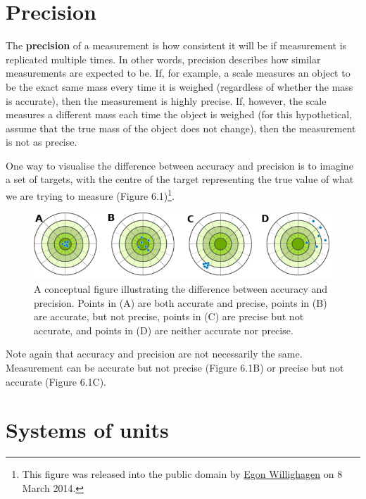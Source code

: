 \documentclass[
]{scrbook}
\begin{document}
\hypertarget{precision}{%
\section{Precision}\label{precision}}

The \textbf{precision} of a measurement is how consistent it will be if measurement is replicated multiple times.
In other words, precision describes how similar measurements are expected to be.
If, for example, a scale measures an object to be the exact same mass every time it is weighed (regardless of whether the mass is accurate), then the measurement is highly precise.
If, however, the scale measures a different mass each time the object is weighed (for this hypothetical, assume that the true mass of the object does not change), then the measurement is not as precise.

One way to visualise the difference between accuracy and precision is to imagine a set of targets, with the centre of the target representing the true value of what we are trying to measure (Figure 6.1)\footnote{This figure was released into the public domain by \href{https://commons.wikimedia.org/wiki/File:Accuracy-vs-precision-nl.svg}{Egon Willighagen} on 8 March 2014.}.

\begin{figure}
\includegraphics[width=1\linewidth]{img/accuracy_vs_precision} \caption{A conceptual figure illustrating the difference between accuracy and precision. Points in (A) are both accurate and precise, points in (B) are accurate, but not precise, points in (C) are precise but not accurate, and points in (D) are neither accurate nor precise.}\label{fig:unnamed-chunk-19}
\end{figure}

Note again that accuracy and precision are not necessarily the same.
Measurement can be accurate but not precise (Figure 6.1B) or precise but not accurate (Figure 6.1C).

\hypertarget{systems-of-units}{%
\section{Systems of units}\label{systems-of-units}}
\end{document}
